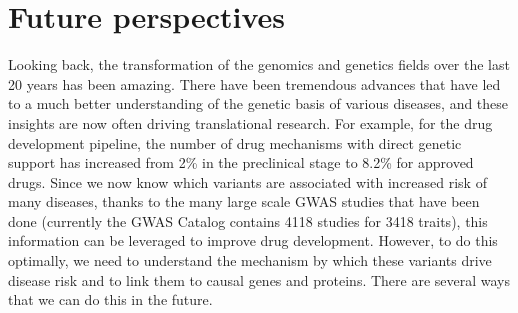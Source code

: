 

\section{Future perspectives}

Looking back, the transformation of the genomics and genetics fields over the last 20 years has been amazing. There have been tremendous advances that have led to a much better understanding of the genetic basis of various diseases, and these insights are now often driving translational research. For example, for the drug development pipeline, the number of drug mechanisms with direct genetic support has increased from 2\% in the preclinical stage to 8.2\% for approved drugs\cite{nelsonSupportHumanGenetic2015}. Since we now know which variants are associated with increased risk of many diseases, thanks to the many large scale GWAS studies that have been done (currently the GWAS Catalog\cite{macarthurNewNHGRIEBICatalog2017} contains 4118 studies for 3418 traits), this information can be leveraged to improve drug development. However, to do this optimally, we need to understand the mechanism by which these variants drive disease risk and to link them to causal genes and proteins. There are several ways that we can do this in the future.

